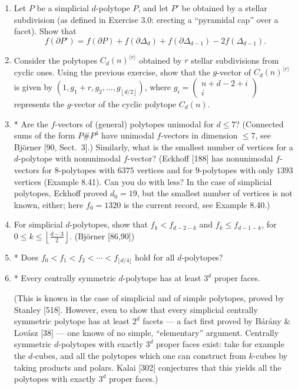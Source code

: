 \documentclass{article}
\begin{document}
\begin{enumerate}
\item Let $P$ be a simplicial $d$-polytope $P$, and let $P'$ be obtained by a stellar subdivision (as defined in Exercise 3.0: erecting a ``pyramidal cap'' over a facet). Show that
\[
f(\partial P')=f(\partial P)+f(\partial\Delta_d)+f(\partial\Delta_{d-1})-2f(\Delta_{d-1}).
\]

\item Consider the polytopes $C_d(n)^{\langle r\rangle}$ obtained by $r$ stellar subdivisions from cyclic ones. Using the previous exercise, show that the $g$-vector of $C_d(n)^{\langle r\rangle}$ is given by $(1,g_1+r,g_2,\dots,g_{\left\lfloor d/2\right\rfloor})$, where $g_i=\begin{pmatrix} n+d-2+i \\ i \end{pmatrix}$ represents the $g$-vector of the cyclic polytope $C_d(n)$.

\item* Are the $f$-vectors of (general) polytopes unimodal for $d\le 7$? (Connected sums of the form $P\# P^4$ have unimodal $f$-vectors in dimension $\le 7$, see Bj\"orner [90, Sect.~3].) Similarly, what is the smallest number of vertices for a $d$-polytope with nonunimodal $f$-vector? (Eckhoff [188] has nonunimodal $f$-vectors for $8$-polytopes with $6375$ vertices and for $9$-polytopes with only $1393$ vertices (Example 8.41). Can you do with less? In the case of simplicial polytopes, Eckhoff proved $d_0=19$, but the smallest number of vertices is not known, either; here $f_0=1320$ is the current record, see Example 8.40.)

\item For simplicial $d$-polytopes, show that $f_k<f_{d-2-k}$ and $f_k\le f_{d-1-k}$, for $0\le k\le \left\lfloor \frac{d-3}{2}\right\rfloor$. (Bj\"orner [86,90])

\item* Does $f_0<f_1<f_2<\cdots<f_{\lfloor d/4\rfloor}$ hold for all $d$-polytopes?

\item* Every centrally symmetric $d$-polytope has at least $3^d$ proper faces. 

(This is known in the case of simplicial and of simple polytopes, proved by Stanley [518]. However, even to show that every simplicial centrally symmetric polytope has at least $2^d$ facets --- a fact first proved by Bárány \& Lovász [38] --- one knows of no simple, ``elementary'' argument. Centrally symmetric $d$-polytopes with exactly $3^d$ proper faces exist: take for example the $d$-cubes, and all the polytopes which one can construct from $k$-cubes by taking products and polars. Kalai [302] conjectures that this yields all the polytopes with exactly $3^d$ proper faces.)


\end{enumerate}
\end{document}
